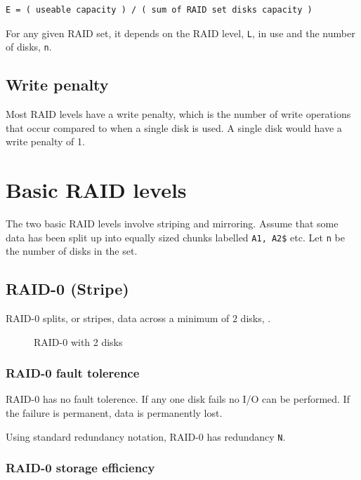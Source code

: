 \begin{verbatim}
E = ( useable capacity ) / ( sum of RAID set disks capacity )
\end{verbatim}

For any given RAID set, it depends on the RAID level, \texttt{L}, in use
and the number of disks, \texttt{n}.

\subsection{Write penalty}\label{write-penalty}

Most RAID levels have a write penalty, which is the number of write
operations that occur compared to when a single disk is used. A single
disk would have a write penalty of 1.

\section{Basic RAID levels}\label{basic-raid-levels}

The two basic RAID levels involve striping and mirroring. Assume that
some data has been split up into equally sized chunks labelled
\texttt{A1,\ A2\$} etc. Let \texttt{n} be the number of disks in the
set.

\subsection{RAID-0 (Stripe)}\label{raid-0-stripe}

RAID-0 splits, or stripes, data across a minimum of \(2\) disks, .

\begin{figure}
\centering
\caption{RAID-0 with 2 disks}
\end{figure}

\subsubsection{RAID-0 fault tolerence}\label{raid-0-fault-tolerence}

RAID-0 has no fault tolerence. If any one disk fails no I/O can be
performed. If the failure is permanent, data is permanently lost.

Using standard redundancy notation, RAID-0 has redundancy \texttt{N}.

\subsubsection{RAID-0 storage
efficiency}\label{raid-0-storage-efficiency}

